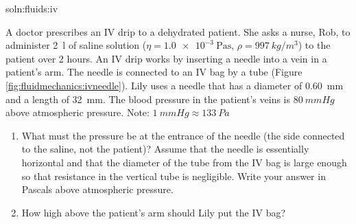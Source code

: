 {{\begin{problem}{soln:fluids:iv}{\label{prob:fluids:iv} A doctor prescribes an IV drip to a dehydrated patient. She asks a nurse, Rob, to administer \SI{2}{l} of saline solution ($\eta=\SI{1.0e-3}{\pascal\second}$, $\rho=\SI{997}{kg/m^3}$) to the patient over 2 hours. An IV drip works by inserting a needle into a vein in a patient's arm. The needle is connected to an IV bag by a tube (Figure \ref{fig:fluidmechanics:ivneedle}). Lily uses a needle that has a diameter of \SI{0.60}{mm} and a length of \SI{32}{mm}. The blood pressure in the patient's veins is $\SI{80}{mm Hg}$ above atmospheric pressure. Note: $\SI{1}{mm Hg}\approx \SI{133}{Pa}$
\begin{enumerate}[label=\alph*),topsep=-10pt]
\item What must the pressure be at the entrance of the needle (the side connected to the saline, not the patient)? Assume that the needle is essentially horizontal and that the diameter of the tube from the IV bag is large enough so that resistance in the vertical tube is negligible. Write your answer in Pascals above atmospheric pressure.
\item How high above the patient's arm should Lily put the IV bag?
\end{enumerate}
}
\end{problem}

\newpage
}}
